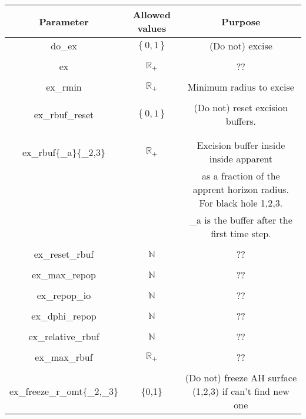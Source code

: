\documentclass{article}
\begin{document}
\begin{table}[h]
   \centering 
   \begin{tabular}{ccc}
      Parameter  & Allowed values & Purpose \\
      \midrule\midrule
      do\_ex 
      &
      $\left\{0,1\right\}$
      &
      (Do not) excise
      \\ \\
      ex 
      &
      $\mathbb{R}_+$
      &
      ??
      \\ \\
      ex\_rmin 
      & 
      $\mathbb{R}_+$
      &
      Minimum radius to excise
      \\ \\
      ex\_rbuf\_reset
      &
      $\left\{0,1\right\}$
      &
      (Do not) reset excision buffers.
      \\
      \\ \\
      ex\_rbuf\{\_a\}\{\_2,3\}
      &
      $\mathbb{R}_+$
      &
      Excision buffer inside inside apparent
      \\
      & & 
      as a fraction of the apprent horizon radius.
      For black hole 1,2,3.
      \\
      & &
      \_a is the buffer after the first time step.
      \\ \\
      ex\_reset\_rbuf 
      &
      $\mathbb{N}$
      &
      ??
      \\ \\
      ex\_max\_repop 
      &
      $\mathbb{N}$
      &
      ??
      \\ \\
      ex\_repop\_io
      &
      $\mathbb{N}$
      &
      ??
      \\ \\
      ex\_dphi\_repop
      &
      $\mathbb{N}$
      &
      ??
      \\ \\
      ex\_relative\_rbuf
      &
      $\mathbb{N}$
      &
      ??
      \\ \\
      ex\_max\_rbuf
      &
      $\mathbb{R}_+$
      &
      ??
      \\ \\
      ex\_freeze\_r\_omt\{\_2,\_3\}
      &
      \{0,1\}
      &
      (Do not) freeze AH surface (1,2,3) if can't find new one
   \end{tabular}
\end{table}
\end{document}
